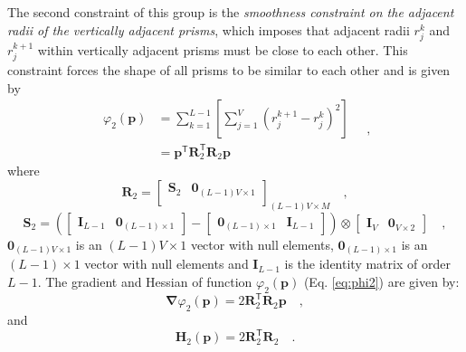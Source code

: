 The second constraint of this group is the \textit{smoothness constraint on the adjacent radii of the vertically adjacent prisms}, which imposes that adjacent radii $r_{j}^{k}$ and $r_{j}^{k+1}$ within vertically adjacent prisms must be close to each other. This constraint forces the shape of all prisms to be similar to each other
and is given by
\begin{equation}\label{eq:phi2}
\begin{split}
\varphi_{2}(\mathbf{p}) &= \sum\limits^{L-1}_{k=1}\left[\sum\limits^{V}_{j=1}\left(r^{k+1}_{j}-r^{k}_{j}\right)^2\right] \\
&= \mathbf{p}^{\mathsf{T}} \mathbf{R}^{\mathsf{T}}_{2}\mathbf{R}_{2}\mathbf{p}
\end{split} \quad ,
\end{equation}
where 
\begin{equation}
\mathbf{R}_{2} = 
\begin{bmatrix}
\mathbf{S}_{2} & \mathbf{0}_{(L-1)V \times 1} \\
\end{bmatrix}_{(L-1)V \times M} \quad ,
\label{eq:R2-matrix}
\end{equation}
\begin{equation}
\mathbf{S}_{2} =
\left( 
\begin{bmatrix} \mathbf{I}_{L-1} & \mathbf{0}_{(L-1) \times 1} \end{bmatrix} -
\begin{bmatrix} \mathbf{0}_{(L-1) \times 1} & \mathbf{I}_{L-1} \end{bmatrix} 
\right) \otimes 
\begin{bmatrix} \mathbf{I}_{V} & \mathbf{0}_{V \times 2} \end{bmatrix} \quad ,
\label{eq:S2-matrix}
\end{equation}
$\mathbf{0}_{(L-1)V \times 1}$ is an $(L-1)V \times 1$ vector with null elements,
$\mathbf{0}_{(L-1) \times 1}$ is an $(L-1) \times 1$ vector with null elements and 
$\mathbf{I}_{L-1}$ is the identity matrix of order $L-1$. The gradient and Hessian of function $\varphi_{2}(\mathbf{p})$ (Eq. \ref{eq:phi2}) are given by:
\begin{equation}\label{eq:phi2_grad}
\boldsymbol{\nabla}\varphi_{2}(\mathbf{p}) = 2\mathbf{R}^\mathsf{T}_{2}\mathbf{R}_{2}\mathbf{p} \quad ,
\end{equation}
and
\begin{equation}\label{eq:phi2_hessian}
\mathbf{H}_{2}(\mathbf{p}) = 2\mathbf{R}^\mathsf{T}_{2}\mathbf{R}_{2} \quad .
\end{equation}

